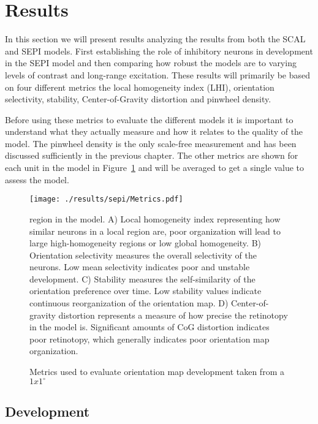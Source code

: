 \section{Results}

In this section we will present results analyzing the results from
both the SCAL and SEPI models. First establishing the role of
inhibitory neurons in development in the SEPI model and then comparing
how robust the models are to varying levels of contrast and long-range
excitation. These results will primarily be based on four different
metrics the local homogeneity index (LHI), orientation selectivity,
stability, Center-of-Gravity distortion and pinwheel density.

Before using these metrics to evaluate the different models it is
important to understand what they actually measure and how it relates
to the quality of the model. The pinwheel density is the only
scale-free measurement and has been discussed sufficiently in the
previous chapter. The other metrics are shown for each unit in the
model in Figure~\ref{MetricPlots} and will be averaged to get a single
value to assess the model.

\begin{figure}
	\centering
        \texttt{[image: ./results/sepi/Metrics.pdf]}
	\caption[Metrics used to evaluate orientation map
      development.]{Metrics used to evaluate orientation map
      development taken from a $1x1^\circ$} region in the model. A)
    Local homogeneity index representing how similar neurons in a
    local region are, poor organization will lead to large
    high-homogeneity regions or low global homogeneity. B) Orientation
    selectivity measures the overall selectivity of the neurons. Low
    mean selectivity indicates poor and unstable development. C)
    Stability measures the self-similarity of the orientation
    preference over time. Low stability values indicate continuous
    reorganization of the orientation map. D) Center-of-gravity
    distortion represents a measure of how precise the retinotopy in
    the model is. Significant amounts of CoG distortion indicates poor
    retinotopy, which generally indicates poor orientation map organization.
	\label{MetricPlots}
\end{figure}


\subsection{Development}

